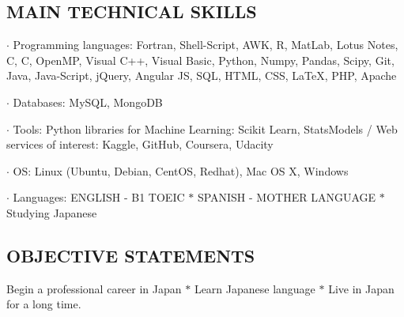 \documentclass[9pt,letterpaper]{extreport}
\newenvironment{indentsection}[1]%
{\begin{list}{}%
	{\setlength{\leftmargin}{#1}}%
	\item[]%
}
{\end{list}}
\newcommand{\CPP}
{C\nolinebreak[4]\hspace{-.05em}\raisebox{.22ex}{\footnotesize\bf ++}}
\begin{document}
\vspace{-1em}
\subsection*{\textcolor{NavyBlue}{ \fontsize{12pt}{20pt}\selectfont \textbf{MAIN TECHNICAL SKILLS} }}


\begin{indentsection}{\parindent}

\begin{description*}
	\item[$\cdot$  Programming languages:]
	Fortran, Shell-Script, AWK, R, MatLab, Lotus Notes, C, \CPP, OpenMP, Visual C++, Visual Basic, Python, Numpy, Pandas, Scipy, Git, Java, Java-Script, jQuery, Angular JS, SQL, HTML, CSS, \LaTeX, PHP, Apache
	\item[$\cdot$  Databases:]
	MySQL, MongoDB
	\item[$\cdot$  Tools:]
	Python libraries for Machine Learning: Scikit Learn, StatsModels / Web services of interest: Kaggle, GitHub, Coursera, Udacity
	\item[$\cdot$  OS:]
	Linux (Ubuntu, Debian, CentOS, Redhat), Mac OS X, Windows
	\item[$\cdot$  Languages:]
	ENGLISH - B1 TOEIC $\ast$ SPANISH - MOTHER LANGUAGE $\ast$ Studying Japanese
	\end{description*}

\end{indentsection}

\vspace{-1em}
\subsection*{\textcolor{NavyBlue}{ \fontsize{12pt}{20pt}\selectfont \textbf{OBJECTIVE STATEMENTS} }}


\begin{indentsection}{\parindent}
	Begin a professional career in Japan $\ast$ Learn Japanese language $\ast$ Live in Japan for a long time.
\end{indentsection}	

\vspace{-0.4em} %
\end{document}
